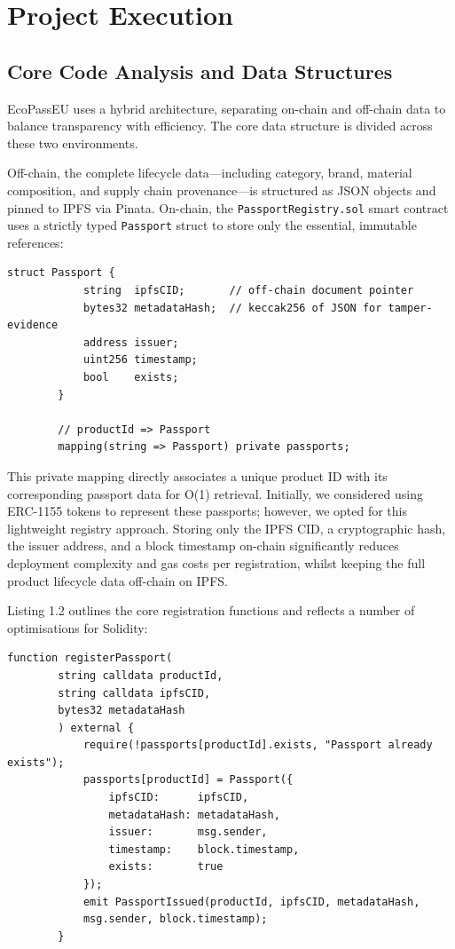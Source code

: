 \documentclass[runningheads]{llncs}
\begin{document}
	
	
	
	
	
	\section{Project Execution}
	
	\subsection{Core Code Analysis and Data Structures}
	EcoPassEU uses a hybrid architecture, separating on-chain and off-chain data to balance transparency with efficiency. The core data structure is divided across these two environments. 
	
	Off-chain, the complete lifecycle data---including category, brand, material composition, and supply chain provenance---is structured as JSON objects and pinned to IPFS via Pinata. On-chain, the \texttt{PassportRegistry.sol} smart contract uses a strictly typed \texttt{Passport} struct to store only the essential, immutable references:
	
	\begin{lstlisting}[language=Solidity, 
		caption={Core Data Structure in PassportRegistry.sol}]
		struct Passport {
			string  ipfsCID;       // off-chain document pointer
			bytes32 metadataHash;  // keccak256 of JSON for tamper-evidence
			address issuer;
			uint256 timestamp;
			bool    exists;
		}
		
		// productId => Passport
		mapping(string => Passport) private passports;
	\end{lstlisting}
	
	This private mapping directly associates a unique product ID with its corresponding 
	passport data for O(1) retrieval. Initially, we considered using ERC-1155 tokens 
	to represent these passports; however, we opted for this lightweight registry 
	approach. Storing only the IPFS CID, a cryptographic hash, the issuer address, 
	and a block timestamp on-chain significantly reduces deployment complexity and 
	gas costs per registration, whilst keeping the full product lifecycle data 
	off-chain on IPFS.
	
	
	Listing 1.2 outlines the core registration functions and reflects a number of optimisations for Solidity:
	\newpage
	\begin{lstlisting}[language=Solidity, caption=registerPassport function]
		function registerPassport(
		string calldata productId,
		string calldata ipfsCID,
		bytes32 metadataHash
		) external {
			require(!passports[productId].exists, "Passport already exists");
			passports[productId] = Passport({
				ipfsCID:      ipfsCID,
				metadataHash: metadataHash,
				issuer:       msg.sender,
				timestamp:    block.timestamp,
				exists:       true
			});
			emit PassportIssued(productId, ipfsCID, metadataHash,
			msg.sender, block.timestamp);
		}
	\end{lstlisting}
	
\end{document}
